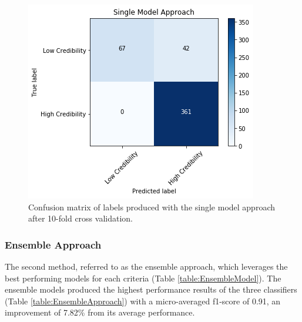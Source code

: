 \documentclass[a4paper,twoside,phd]{BYUPhys}
\begin{document}
\begin{figure}[H]
	\centering
	\includegraphics[totalheight=7cm]{images/single-model-performance.png}
	\caption{Confusion matrix of labels produced with the single model approach after 10-fold cross validation.}
	\label{fig:SingleModelPerformance}
\end{figure}

\subsubsection{Ensemble Approach}
The second method, referred to as the ensemble approach, which leverages the best performing models for each criteria (Table \ref{table:EnsembleModel}). The ensemble models produced the highest performance results of the three classifiers (Table \ref{table:EnsembleApproach}) with a micro-averaged f1-score of 0.91, an improvement of 7.82\% from its average performance.
\end{document}
